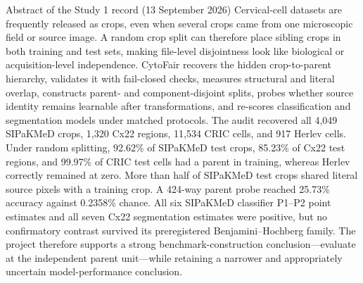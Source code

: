 \begin{keybox}{Abstract of the Study 1 record (13 September 2026)}
Cervical-cell datasets are frequently released as crops, even when several crops came from one microscopic field or source image. A random crop split can therefore place sibling crops in both training and test sets, making file-level disjointness look like biological or acquisition-level independence. CytoFair recovers the hidden crop-to-parent hierarchy, validates it with fail-closed checks, measures structural and literal overlap, constructs parent- and component-disjoint splits, probes whether source identity remains learnable after transformations, and re-scores classification and segmentation models under matched protocols. The audit recovered all 4,049 SIPaKMeD crops, 1,320 Cx22 regions, 11,534 CRIC cells, and 917 Herlev cells. Under random splitting, 92.62\% of SIPaKMeD test crops, 85.23\% of Cx22 test regions, and 99.97\% of CRIC test cells had a parent in training, whereas Herlev correctly remained at zero. More than half of SIPaKMeD test crops shared literal source pixels with a training crop. A 424-way parent probe reached 25.73\% accuracy against 0.2358\% chance. All six SIPaKMeD classifier P1--P2 point estimates and all seven Cx22 segmentation estimates were positive, but no confirmatory contrast survived its preregistered Benjamini--Hochberg family. The project therefore supports a strong benchmark-construction conclusion---evaluate at the independent parent unit---while retaining a narrower and appropriately uncertain model-performance conclusion.
\end{keybox}
